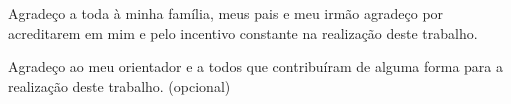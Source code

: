 \begin{agradecimentos}

Agradeço a toda à minha família, meus pais e meu irmão agradeço por
acreditarem em mim e pelo incentivo constante na realização deste trabalho.

Agradeço ao meu orientador e a todos que contribuíram de alguma forma
para a realização deste trabalho. (opcional)

\end{agradecimentos}